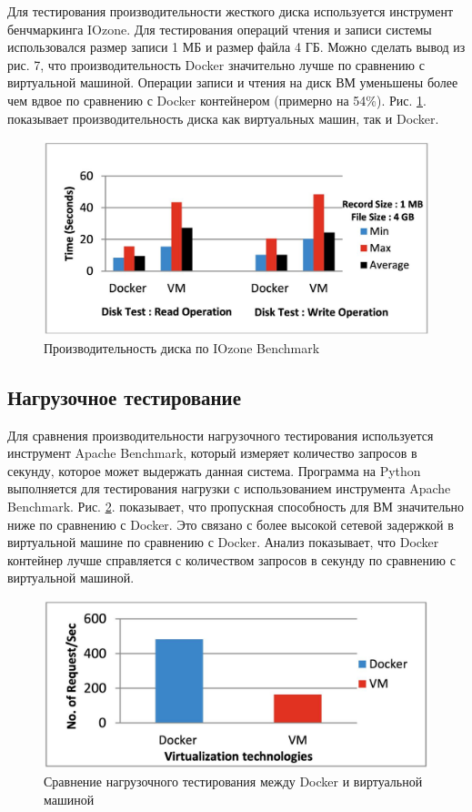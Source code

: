 \documentclass{mirea}
\begin{document}
	Для тестирования производительности жесткого диска используется инструмент бенчмаркинга IOzone. Для тестирования операций чтения и записи системы использовался размер записи 1 МБ и размер файла 4 ГБ. Можно сделать вывод из рис. 7, что производительность Docker значительно лучше по сравнению с виртуальной машиной. Операции записи и чтения на диск ВМ уменьшены более чем вдвое по сравнению с Docker контейнером (примерно на 54\%). Рис. \ref{fig:pic7}. показывает производительность диска как виртуальных машин, так и Docker.
	
	\begin{figure}[H]
		\centering
		\includegraphics[width=.6\textwidth]{img7}
		\parskip=6pt
		\caption{Производительность диска по IOzone Benchmark}
		\label{fig:pic7}
	\end{figure}

	\subsection{Нагрузочное тестирование}
	
	Для сравнения производительности нагрузочного тестирования используется инструмент Apache Benchmark, который измеряет количество запросов в секунду, которое может выдержать данная система. Программа на Python выполняется для тестирования нагрузки с использованием инструмента Apache Benchmark. Рис. \ref{fig:pic8}. показывает, что пропускная способность для ВМ значительно ниже по сравнению с Docker. Это связано с более высокой сетевой задержкой в виртуальной машине по сравнению с Docker. Анализ показывает, что Docker контейнер лучше справляется с количеством запросов в секунду по сравнению с виртуальной машиной.
	
	\begin{figure}[H]
		\centering
		\includegraphics[width=.6\textwidth]{img8}
		\parskip=6pt
		\caption{Сравнение нагрузочного тестирования между Docker и виртуальной машиной}
		\label{fig:pic8}
	\end{figure}
\end{document}
